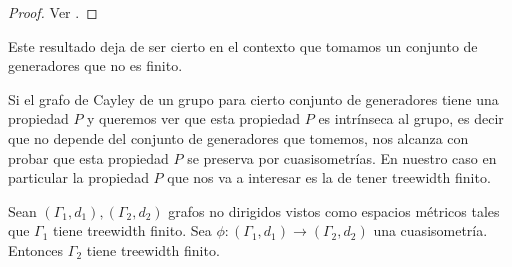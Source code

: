 \documentclass[tesis.tex]{subfiles}
\begin{document}
\begin{proof}
	Ver \cite{bridson2013metric}.
\end{proof}

Este resultado deja de ser cierto en el contexto que tomamos un conjunto de generadores que no es finito.


Si el grafo de Cayley de un grupo para cierto conjunto de generadores tiene una propiedad $P$ y queremos ver que esta propiedad $P$ es intrínseca al grupo, es decir que no depende del conjunto de generadores que tomemos, nos alcanza con probar que esta propiedad $P$ se preserva por cuasisometrías.
En nuestro caso en particular la propiedad $P$ que nos va a interesar es la de tener treewidth finito.


\begin{prop} \label{treewidth-inv}
	Sean $(\Gamma_{1},d_{1}), (\Gamma_{2}, d_{2})$ grafos no dirigidos vistos como espacios métricos tales que $\Gamma_{1}$ tiene treewidth finito.
	Sea $\phi:(\Gamma_{1},d_{1})\to (\Gamma_{2},d_{2})$ una cuasisometría.
	Entonces $\Gamma_{2}$ tiene treewidth finito.
\end{prop}
\end{document}
